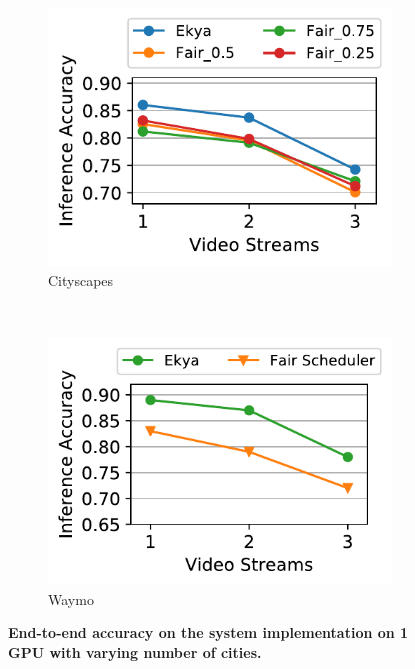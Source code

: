 \begin{figure}
  \centering
  \begin{subfigure}[t]{0.5\linewidth}
    \centering
    \includegraphics[width=\linewidth]{results/sys_impl/multicam_acc_vs_res_sysimpl_cityscapes.pdf} 
    \caption{\small Cityscapes}
    \label{fig:sysimpl-result-cityscapes}
  \end{subfigure}
  ~~~
  \begin{subfigure}[t]{0.5\linewidth}
    \centering
    \includegraphics[width=\linewidth]{results/sys_impl/sysimpl_varyingcities_waymo.pdf} 
    \caption{\small Waymo}
    \label{fig:sysimpl-result-waymo}
  \end{subfigure}
  \caption{\small \bf End-to-end accuracy on the system implementation on 1 GPU with varying number of cities.}
  \label{fig:sysimpl-result}
\end{figure}